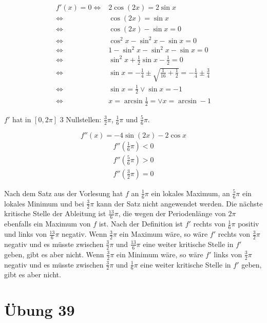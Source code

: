 \documentclass[a4paper,10pt]{article}
\begin{document}
\begin{align*}
 f'(x) = 0 \Leftrightarrow & 2\cos (2x) = 2\sin x\\
 \Leftrightarrow & \cos (2x) = \sin x\\
 \Leftrightarrow & \cos(2x) - \sin x = 0\\
 \Leftrightarrow & \cos^2 x - \sin^2 x - \sin x = 0\\
 \Leftrightarrow & 1 - \sin^2 x - \sin^2 x - \sin x = 0\\
 \Leftrightarrow & \sin^2 x + \frac{1}{2}\sin x - \frac{1}{2} = 0\\
 \Leftrightarrow & \sin x = -\frac{1}{4} \pm \sqrt{\frac{1}{16} + \frac{1}{2}} = -\frac{1}{4} \pm \frac{3}{4}\\
 \Leftrightarrow & \sin x = \frac{1}{2} \lor \sin x = -1\\
 \Leftrightarrow & x = \arcsin \frac{1}{2} = \lor x = \arcsin -1
\end{align*}

$f'$ hat in $[0, 2\pi]$ 3 Nullstellen: $\frac{3}{2}\pi$, $\frac{1}{6}\pi$ und $\frac{5}{6}\pi$.

\begin{equation}
 f''(x) = -4 \sin (2x) - 2 \cos x
\end{equation}
\begin{align*}
 f''(\frac{1}{6}\pi) < 0\\
 f''(\frac{5}{6}\pi) > 0\\
 f''(\frac{3}{2}\pi) = 0
\end{align*}

Nach dem Satz aus der Vorlesung hat $f$ an $\frac{1}{6}\pi$ ein lokales Maximum, an $\frac{5}{6}\pi$ ein lokales Minimum und bei $\frac{3}{2}\pi$ kann der Satz nicht angewendet werden.
Die nächste kritische Stelle der Ableitung ist $\frac{13}{6}\pi$, die wegen der Periodenlänge von $2\pi$ ebenfalls ein Maximum von $f$ ist.
Nach der Definition ist $f'$ rechts von $\frac{1}{6}\pi$ positiv und links von $\frac{13}{6}\pi$ negativ.
Wenn $\frac{3}{2}\pi$ ein Maximum wäre, so wäre $f'$ rechts von $\frac{3}{2}\pi$ negativ und es müsste zwischen $\frac{3}{2}\pi$ und $\frac{13}{6}\pi$ eine weiter kritische Stelle in $f'$ geben, gibt es aber nicht.
Wenn $\frac{3}{2}\pi$ ein Minimum wäre, so wäre $f'$ links von $\frac{3}{2}\pi$ negativ und es müsste zwischen $\frac{3}{2}\pi$ und $\frac{1}{6}\pi$ eine weiter kritische Stelle in $f'$ geben, gibt es aber nicht.

\section*{Übung 39}
\end{document}
